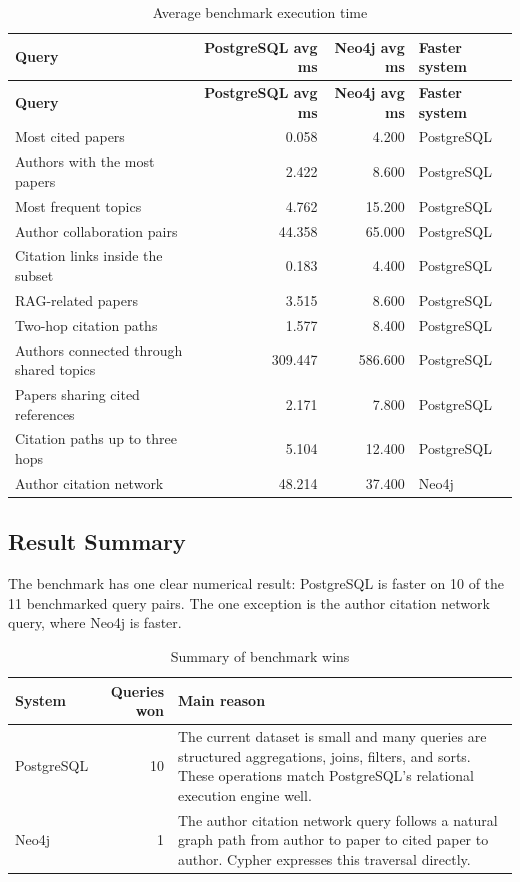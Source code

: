 \documentclass[11pt]{article}
\begin{document}
\small
\setlength{\tabcolsep}{3pt}
\begin{longtable}{|p{}|r|r|p{}|}
\caption{Average benchmark execution time}
\label{tab:benchmark-results}\\
\hline
\textbf{Query} & \textbf{PostgreSQL avg ms} & \textbf{Neo4j avg ms} & \textbf{Faster system} \\
\hline
\endfirsthead
\hline
\textbf{Query} & \textbf{PostgreSQL avg ms} & \textbf{Neo4j avg ms} & \textbf{Faster system} \\
\hline
\endhead
Most cited papers & 0.058 & 4.200 & PostgreSQL \\
\hline
Authors with the most papers & 2.422 & 8.600 & PostgreSQL \\
\hline
Most frequent topics & 4.762 & 15.200 & PostgreSQL \\
\hline
Author collaboration pairs & 44.358 & 65.000 & PostgreSQL \\
\hline
Citation links inside the subset & 0.183 & 4.400 & PostgreSQL \\
\hline
RAG-related papers & 3.515 & 8.600 & PostgreSQL \\
\hline
Two-hop citation paths & 1.577 & 8.400 & PostgreSQL \\
\hline
Authors connected through shared topics & 309.447 & 586.600 & PostgreSQL \\
\hline
Papers sharing cited references & 2.171 & 7.800 & PostgreSQL \\
\hline
Citation paths up to three hops & 5.104 & 12.400 & PostgreSQL \\
\hline
Author citation network & 48.214 & 37.400 & Neo4j \\
\hline
\end{longtable}
\normalsize
\setlength{\tabcolsep}{6pt}

\subsection{Result Summary}

The benchmark has one clear numerical result: PostgreSQL is faster on 10 of the 11 benchmarked query pairs.
The one exception is the author citation network query, where Neo4j is faster.

\begin{table}[H]
\centering
\caption{Summary of benchmark wins}
\label{tab:benchmark-wins}
\begin{tabular}{|l|r|p{}|}
\hline
\textbf{System} & \textbf{Queries won} & \textbf{Main reason} \\
\hline
PostgreSQL & 10 & The current dataset is small and many queries are structured aggregations, joins, filters, and sorts. These operations match PostgreSQL's relational execution engine well. \\
\hline
Neo4j & 1 & The author citation network query follows a natural graph path from author to paper to cited paper to author. Cypher expresses this traversal directly. \\
\hline
\end{tabular}
\end{table}
\end{document}
